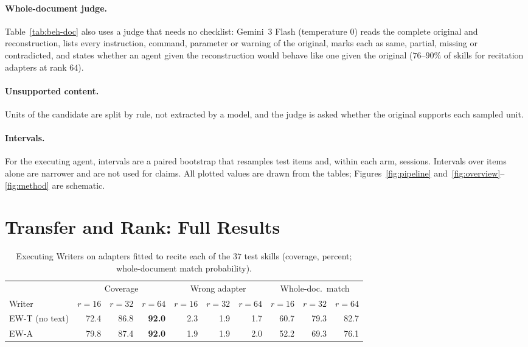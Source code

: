 \documentclass[11pt]{article}
\newcommand{\best}[1]{\textbf{#1}}
\newcommand{\EWT}{\textsc{EW-T}}
\newcommand{\EWA}{\textsc{EW-A}}
\begin{document}
\paragraph{Whole-document judge.} Table~\ref{tab:beh-doc} also uses a judge that needs no checklist: Gemini~3 Flash (temperature $0$) reads the complete
original and reconstruction, lists every instruction, command, parameter or warning of the original, marks each as same, partial, missing or
contradicted, and states whether an agent given the reconstruction would behave like one given the original ($76$--$90\%$ of skills for recitation
adapters at rank $64$).

\paragraph{Unsupported content.} Units of the candidate are split by rule, not extracted by a model, and the judge is asked whether the original
supports each sampled unit.

\paragraph{Intervals.} For the executing agent, intervals are a paired bootstrap that resamples test items and, within each arm, sessions. Intervals
over items alone are narrower and are not used for claims. All plotted values are drawn from the tables; Figures~\ref{fig:pipeline}
and~\ref{fig:overview}--\ref{fig:method} are schematic.

\section{Transfer and Rank: Full Results}
\label{app:rank}

\begin{table}[h]
\centering
\caption{Executing Writers on adapters fitted to recite each of the $37$ test skills (coverage, percent; whole-document match probability).}
\label{tab:rank}
\small
\setlength{\tabcolsep}{4pt}
\begin{tabular}{lrrrrrrrrr}
\toprule
 & \multicolumn{3}{c}{Coverage} & \multicolumn{3}{c}{Wrong adapter} & \multicolumn{3}{c}{Whole-doc.\ match}\\
\cmidrule(lr){2-4}\cmidrule(lr){5-7}\cmidrule(lr){8-10}
Writer & $r=16$ & $r=32$ & $r=64$ & $r=16$ & $r=32$ & $r=64$ & $r=16$ & $r=32$ & $r=64$\\
\midrule
\EWT{} (no text) & 72.4 & 86.8 & \best{92.0} & 2.3 & 1.9 & 1.7 & 60.7 & 79.3 & 82.7\\
\EWA{}           & 79.8 & 87.4 & \best{92.0} & 1.9 & 1.9 & 2.0 & 52.2 & 69.3 & 76.1\\
\bottomrule
\end{tabular}
\end{table}
\end{document}
